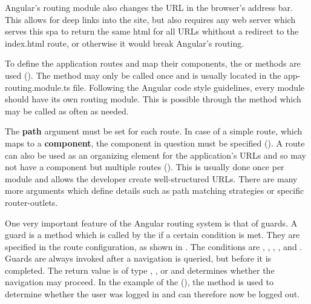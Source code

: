 Angular's routing module also changes the URL in the browser's address bar. This allows for deep links into the site, but also requires any web server which serves this \gls{spa} to return the same \gls{html} for all URLs whithout a redirect to the index.html route, or otherwise it would break Angular's routing.


To define the application routes and map their components, the  or  methods are used (). The  method may only be called once and is usually located in the app-routing.module.ts file. Following the Angular code style guidelines, every module should have its own routing module. This is possible through the  method which may be called as often as needed.

The \textbf{path} argument must be set for each route. In case of a simple route, which maps to a \textbf{component}, the component in question must be specified (). A route can also be used as an organizing element for the application's URLs and so may not have a component but multiple routes (). This is usually done once per module and allows the developer create well-structured URLs. There are many more arguments which define details such as path matching strategies or specific router-outlets.

One very important feature of the Angular routing system is that of guards. A guard is a method which is called by the  if a certain condition is met. They are specified in the route configuration, as shown in . The conditions are , , , , and . Guards are always invoked after a navigation is queried, but before it is completed. The return value is of type , , or  and determines whether the navigation may proceed. In the example of the  (), the  method is used to determine whether the user was logged in and can therefore now be logged out.

